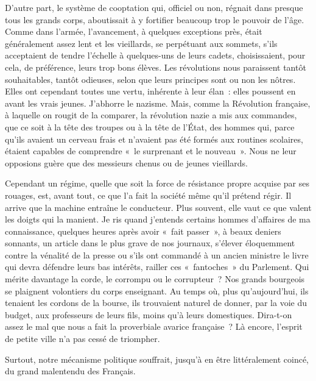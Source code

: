 \documentclass[french,twoside]{book} %
\begin{document}
D’autre part, le système de cooptation qui,   officiel ou non, régnait dans presque tous les grands corps, aboutissait à y fortifier beaucoup trop le pouvoir de l’âge. Comme dans l’armée, l’avancement, à quelques exceptions près, était généralement assez lent et les vieillards, se perpétuant aux sommets, s’ils acceptaient de tendre l’échelle à quelques-uns de leurs cadets, choisissaient, pour cela, de préférence, leurs trop bons élèves. Les révolutions nous paraissent tantôt souhaitables, tantôt odieuses, selon que leurs principes sont ou non les nôtres. Elles ont cependant toutes une vertu, inhérente à leur élan : elles poussent en avant les vrais jeunes. J’abhorre le nazisme. Mais, comme la Révolution française, à laquelle on rougit de la comparer, la révolution nazie a mis aux commandes, que ce soit à la tête des troupes ou à la tête de l’État, des hommes qui, parce qu’ils avaient un cerveau frais et n’avaient pas été formés aux routines scolaires, étaient capables de comprendre « le surprenant et le nouveau ». Nous ne leur opposions guère que des messieurs chenus ou de jeunes vieillards.\par
Cependant un régime, quelle que soit la force de résistance propre acquise par ses rouages, est, avant tout, ce que l’a fait la société même qu’il prétend régir. Il arrive que la machine entraîne le conducteur. Plus souvent, elle vaut ce que valent les doigts qui la manient. Je ris quand j’entends certains hommes d’affaires de ma connaissance, quelques heures après avoir « fait passer », à beaux deniers sonnants, un article dans le plus grave de nos journaux, s’élever éloquemment contre la vénalité de la presse ou s’ils ont commandé à un ancien ministre le livre qui devra défendre leurs bas intérêts, railler ces « fantoches » du Parlement. Qui mérite davantage la corde, le corrompu ou le corrupteur ? Nos grands bourgeois se plaignent volontiers du corps enseignant. Au temps où, plus qu’aujourd’hui, ils tenaient les cordons de la bourse, ils trouvaient naturel de donner, par la voie du budget, aux professeurs de   leurs fils, moins qu’à leurs domestiques. Dira-t-on assez le mal que nous a fait la proverbiale avarice française ? Là encore, l’esprit de petite ville n’a pas cessé de triompher.\par
Surtout, notre mécanisme politique souffrait, jusqu’à en être littéralement coincé, du grand malentendu des Français.\par
\end{document}
